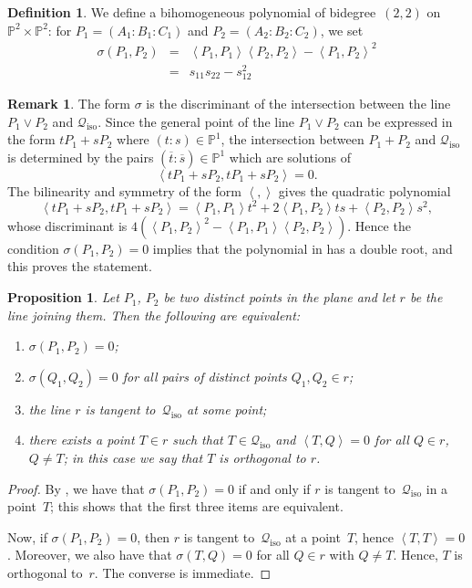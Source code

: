 \documentclass{amsart}
\theoremstyle{plain}
\newtheorem{prop}[lemma]{Proposition}
\theoremstyle{definition}
\newtheorem{definition}[lemma]{Definition}
\newtheorem{rmk}[lemma]{Remark}
\newcommand{\p}{\mathbb{P}}
\newcommand{\iso}{\mathcal{Q}_{\mathrm{iso}}}
\newcommand{\scl}[2]{\left\langle {#1}, {#2} \right\rangle}
\begin{document}
\begin{definition}
\label{definition:sigma}
We define a bihomogeneous polynomial of bidegree~$(2,2)$ on $\p^2 \times \p^2$: for $P_1 = (A_1: B_1: C_1)$ and $P_2 = (A_2: B_2: C_2)$, we set
%
\begin{eqnarray}
\label{formula:sigma}
  \sigma(P_1, P_2) &=& \scl{P_1}{P_1} \scl{P_2}{P_2} - \scl{P_1}{P_2}^2 \\
   & = & s_{11}s_{22}-s_{12}^2
\end{eqnarray}
\end{definition}

\begin{rmk}\label{rmk:sigma_discr}
The form $\sigma$ is the discriminant of the intersection between the line $P_1 \vee P_2$ and $\iso$.
Since the general point of the line $P_1 \vee P_2$ can be expressed in the form
$t P_1 + sP_2$ where $(t:s) \in \p^1$, the intersection between $P_1+P_2$
and $\iso$ is determined by the pairs $( \overline t: \overline s)\in \p^1$ which are solutions of
$$
\scl{t P_1 + sP_2}{t P_1 + sP_2} =0.
$$
The bilinearity and symmetry of the form $\scl{}{}$ gives the quadratic polynomial
\begin{equation}\label{eq:intersection_isotropic}
\scl{t P_1 + sP_2}{t P_1 + sP_2}= \scl{P_1}{P_1} t^2
+2\scl{P_1}{P_2} ts + \scl{P_2}{P_2}s^2,
\end{equation}
whose discriminant is $4 ( \scl{P_1}{P_2}^2 - \scl{P_1}{P_1} \scl{P_2}{P_2})$.
Hence the condition $\sigma(P_1,P_2)=0$ implies that the polynomial in 
has a double root, and this proves the statement.
\end{rmk}

\begin{prop}
\label{proposition:sigma_tangency}
  Let $P_1$, $P_2$ be two distinct points in the plane and let $r$ be the line joining them.
  Then the following are equivalent:
  \begin{enumerate}
  \item $\sigma(P_1, P_2) = 0$;
  \item $\sigma(Q_1, Q_2) = 0$ for all pairs of distinct points $Q_1, Q_2 \in r$;
  \item the line $r$ is tangent to~$\iso$ at some point;
  \item there exists a point $T \in r$ such that  $T \in \iso$ and $\scl{T}{Q} = 0$ for all $Q \in r$, $Q \neq T$; in this case we say that $T$ is \emph{orthogonal} to $r$.
  \end{enumerate}
\end{prop}
\begin{proof}
  By , we have that $\sigma(P_1, P_2) = 0$ if and only if $r$ is tangent to~$\iso$ in a point~$T$; this shows that the first three items are equivalent.

  Now, if $\sigma(P_1, P_2) = 0$, then $r$ is tangent to~$\iso$ at a point~$T$, hence $\scl{T}{T} = 0$. Moreover, we also have that $\sigma(T, Q) = 0$ for all $Q \in r$ with $Q \neq T$. Hence, $T$ is orthogonal to~$r$.
  The converse is immediate.
\end{proof}
\end{document}
